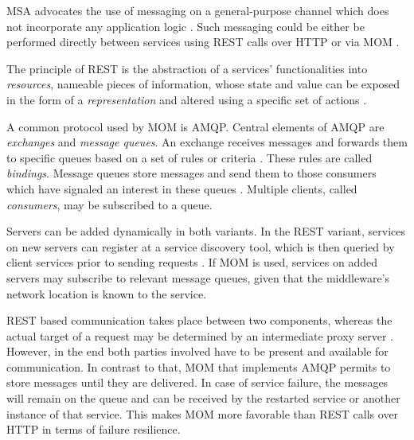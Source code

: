   \ac{MSA} advocates the use of messaging on a general-purpose channel which does not incorporate any application logic \cite[pp.~20]{Strimbei2015Software}. Such messaging could be either be performed directly between services using \ac{REST} calls over \ac{HTTP} or via \ac{MOM} \cite[pp.~23-24, p.~30]{Newman2015Building}.

  The principle of \ac{REST} is the abstraction of a services' functionalities into \emph{resources}, nameable pieces of information, whose state and value can be exposed in the form of a \emph{representation} and altered using a specific set of actions \cite[p.~3]{Fielding2002Principled}.

  A common protocol used by \ac{MOM} is \ac{AMQP}. Central elements of \ac{AMQP} are \emph{exchanges} and \emph{message queues}. An exchange receives messages and forwards them to specific queues based on a set of rules or criteria \cite[p.~88]{Vinoski2006Advanced}. These rules are called \emph{bindings}.
  Message queues store messages and send them to those consumers which have signaled an interest in these queues \cite[p.~88]{Vinoski2006Advanced}. Multiple clients, called \emph{consumers}, may be subscribed to a queue.

  Servers can be added dynamically in both variants. In the \ac{REST} variant, services on new servers can register at a service discovery tool, which is then queried by client services prior to sending requests \cite{Richardson2015Service}. If \ac{MOM} is used, services on added servers may subscribe to relevant message queues, given that the middleware's network location is known to the service.

  \ac{REST} based communication takes place between two components, whereas the actual target of a request may be determined by an intermediate proxy server \cite[p.~6]{Fielding2002Principled}. However, in the end both parties involved have to be present and available for communication.
  In contrast to that, \ac{MOM} that implements \ac{AMQP} permits to store messages until they are delivered. In case of service failure, the messages will remain on the queue and can be received by the restarted service or another instance of that service. This makes \ac{MOM} more favorable than \ac{REST} calls over \ac{HTTP} in terms of failure resilience.

